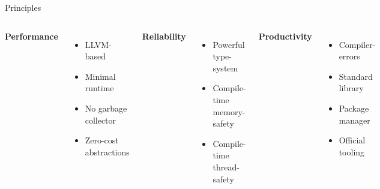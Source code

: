 \begin{frame}{Principles}
    \begin{columns}[T]%
        {\bfseries\large Performance}%
        \begin{itemize}
            \item LLVM-based
            \item Minimal runtime
            \item No garbage collector
            \item Zero-cost abstractions
        \end{itemize}%

        {\bfseries\large Reliability}%
        \begin{itemize}
            \item Powerful type-system
            \item Compile-time memory-safety
            \item Compile-time thread-safety
        \end{itemize}%

        {\bfseries\large Productivity}%
        \begin{itemize}
            \item Compiler-errors
            \item Standard library
            \item Package manager
            \item Official tooling
        \end{itemize}%
    \end{columns}%
\end{frame}

